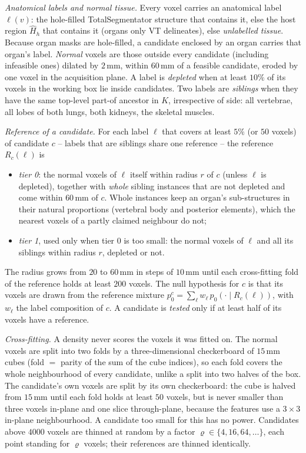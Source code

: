 \documentclass[fleqn,10pt]{olplainarticle}
\begin{document}
\textit{Anatomical labels and normal tissue.} Every voxel carries an anatomical label $\ell(v)$: the hole-filled
TotalSegmentator structure that contains it, else the host region $\hat H_h$ that contains it (organs only VT delineates),
else \emph{unlabelled tissue}. Because organ masks are hole-filled, a candidate enclosed by an organ carries that organ's
label. \emph{Normal} voxels are those outside every candidate (including infeasible ones) dilated by $2$\,mm, within
$60$\,mm of a feasible candidate, eroded by one voxel in the acquisition plane. A label is \emph{depleted} when at least
$10\%$ of its voxels in the working box lie inside candidates. Two labels are \emph{siblings} when they have the same
top-level part-of ancestor in $K$, irrespective of side: all vertebrae, all lobes of both lungs, both kidneys, the
skeletal muscles.

\textit{Reference of a candidate.} For each label $\ell$ that covers at least $5\%$ (or $50$ voxels) of candidate $c$ --
labels that are siblings share one reference -- the reference $R_c(\ell)$ is
\begin{itemize}
\item \emph{tier 0}: the normal voxels of $\ell$ itself within radius $r$ of $c$ (unless $\ell$ is depleted), together with
\emph{whole} sibling instances that are not depleted and come within $60$\,mm of $c$. Whole instances keep an organ's
sub-structures in their natural proportions (vertebral body and posterior elements), which the nearest voxels of a
partly claimed neighbour do not;
\item \emph{tier 1}, used only when tier 0 is too small: the normal voxels of $\ell$ and all its siblings within radius $r$,
depleted or not.
\end{itemize}
The radius grows from $20$ to $60$\,mm in steps of $10$\,mm until each cross-fitting fold of the reference holds at least
$200$ voxels. The null hypothesis for $c$ is that its voxels are drawn from the reference mixture
$p_0^{c}=\sum_\ell w_\ell\,p_0(\cdot\mid R_c(\ell))$, with $w_\ell$ the label composition of $c$. A candidate is
\emph{tested} only if at least half of its voxels have a reference.

\textit{Cross-fitting.} A density never scores the voxels it was fitted on. The normal voxels are split into two folds by a
three-dimensional checkerboard of $15$\,mm cubes (fold $=$ parity of the sum of the cube indices), so each fold covers the
whole neighbourhood of every candidate, unlike a split into two halves of the box. The candidate's own voxels are split by
its own checkerboard: the cube is halved from $15$\,mm until each fold holds at least $50$ voxels, but is never smaller
than three voxels in-plane and one slice through-plane, because the features use a $3\times3$ in-plane neighbourhood. A
candidate too small for this has no power. Candidates above $4000$ voxels are thinned at random by a factor
$\varrho\in\{4,16,64,\dots\}$, each point standing for $\varrho$ voxels; their references are thinned identically.
\end{document}
